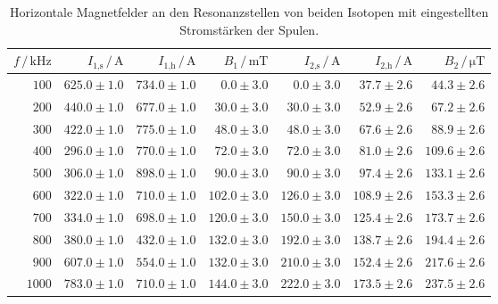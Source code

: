 \begin{table}
    \centering
    \caption{Horizontale Magnetfelder an den Resonanzstellen von beiden Isotopen mit eingestellten Stromstärken der Spulen.}
    \label{tab:f}
    \begin{tabular}{r r r r r r r}
        \toprule
        $f \,/\, \unit{\kilo\hertz}$ & $I_\text{1,s} \,/\, \unit{\ampere}$ & $I_\text{1,h} \,/\, \unit{\ampere}$ & $B_\text{1} \,/\, \unit{\milli\tesla}$ & $I_\text{2,s} \,/\, \unit{\ampere}$ & $I_\text{2,h} \,/\, \unit{\ampere}$ & $B_\text{2} \,/\, \unit{\micro\tesla}$\\
        \midrule
        $100 $ & $625.0\pm1.0$ & $734.0\pm1.0$ & $0.0\pm3.0$ & $0.0\pm3.0$  & $37.7\pm2.6$ & $44.3\pm2.6$ \\
        $200 $ & $440.0\pm1.0$ & $677.0\pm1.0$ & $30.0\pm3.0$ & $30.0\pm3.0$  & $52.9\pm2.6$ & $67.2\pm2.6$ \\
        $300 $ & $422.0\pm1.0$ & $775.0\pm1.0$ & $48.0\pm3.0$ & $48.0\pm3.0$  & $67.6\pm2.6$ & $88.9\pm2.6$ \\
        $400 $ & $296.0\pm1.0$ & $770.0\pm1.0$ & $72.0\pm3.0$  & $72.0\pm3.0 $ & $81.0\pm2.6$ & $109.6\pm2.6$ \\
        $500 $ & $306.0\pm1.0$ & $898.0\pm1.0$ & $90.0\pm3.0$  & $90.0\pm3.0 $ & $97.4\pm2.6$ & $133.1\pm2.6$ \\
        $600 $ & $322.0\pm1.0$ & $710.0\pm1.0$ & $102.0\pm3.0$ & $126.0\pm3.0$ & $108.9\pm2.6$ & $153.3\pm2.6$ \\
        $700 $ & $334.0\pm1.0$ & $698.0\pm1.0$ & $120.0\pm3.0$ & $150.0\pm3.0$ & $125.4\pm2.6$ & $173.7\pm2.6$ \\
        $800 $ & $380.0\pm1.0$ & $432.0\pm1.0$ & $132.0\pm3.0$ & $192.0\pm3.0$ & $138.7\pm2.6$ & $194.4\pm2.6$ \\
        $900 $ & $607.0\pm1.0$ & $554.0\pm1.0$ & $132.0\pm3.0$ & $210.0\pm3.0$ & $152.4\pm2.6$ & $217.6\pm2.6$ \\
        $1000$ & $783.0\pm1.0$ & $710.0\pm1.0$ & $144.0\pm3.0$ & $222.0\pm3.0$ & $173.5\pm2.6$ & $237.5\pm2.6$ \\
        \bottomrule
    \end{tabular}
\end{table}

